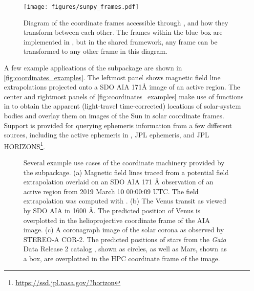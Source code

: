 \begin{figure}
    \centering
    \texttt{[image: figures/sunpy\_frames.pdf]}
    \caption{Diagram of the coordinate frames accessible through , and how they transform between each other.
    The frames within the blue box are implemented in , but in the shared framework, any frame can be transformed to any other frame in this diagram.}
    \label{fig:transform_graph}
\end{figure}

A few example applications of the  subpackage are shown in \autoref{fig:coordinates_examples}.
The leftmost panel shows magnetic field line extrapolations projected onto a SDO AIA 171\AA{} image of an active region.
The center and rightmost panels of \autoref{fig:coordinates_examples} make use of functions in  to obtain the apparent (light-travel time-corrected) locations of solar-system bodies and overlay them on images of the Sun in solar coordinate frames.
Support is  provided for querying ephemeris information from a few different sources, including the active ephemeris in , JPL ephemeris, and JPL HORIZONS\footnote{\url{https://ssd.jpl.nasa.gov/?horizon}}.

\begin{figure}
    \caption{Several example use cases of the coordinate machinery provided by the  subpackage.
    (a) Magnetic field lines traced from a potential field extrapolation overlaid on an SDO AIA 171 \AA{} observation of an active region from 2019 March 10 00:00:09 UTC.
    The field extrapolation was computed with  \citep{david_stansby_2019_3237053}.
    (b) The Venus transit as viewed by SDO AIA in 1600 \AA. The predicted position of Venus is overplotted in the helioprojective coordinate frame of the AIA image.
    (c) A coronagraph image of the solar corona as observed by STEREO-A COR-2. The predicted positions of stars from the \textit{Gaia} \citep{gaia_collaboration_gaia_2016} Data Release 2 catalog \citep{gaia_collaboration_gaia_2018}, shown as circles, as well as Mars, shown as a box, are overplotted in the HPC coordinate frame of the image.}
    \label{fig:coordinates_examples}
\end{figure}
